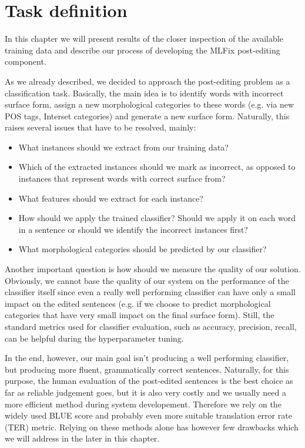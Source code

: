 \chapter{Task definition}
\label{chap:task_descr}

In this chapter we will present results of the closer inspection
of the available training data and describe our process of developing
the MLFix post-editing component.


As we already described, we decided to approach the post-editing problem as a classification
task. Basically, the main idea is to identify words with incorrect surface form,
assign a new morphological categories to these words (e.g. via new POS tags, Interset
categories) and generate a new surface form. Naturally, this raises several issues
that have to be resolved, mainly:
\begin{itemize}
    \item What instances should we extract from our training data?
    \item Which of the extracted instances should we mark as incorrect, as opposed
        to instances that represent words with correct surface from?
    \item What features should we extract for each instance?
    \item How should we apply the trained classifier? Should we apply it
        on each word in a sentence or should we identify the incorrect instances
        first?
    \item What morphological categories should be predicted by our classifier?
\end{itemize}

Another important question is how should we measure the quality of our solution.
Obviously, we cannot base the quality of our system on the performance of the
classifier itself since even a really well performing classifier can have only a small
impact on the edited sentences (e.g. if we choose to predict morphological categories
that have very small impact on the final surface form). Still, the standard metrics
used for classifier evaluation, such as accuracy, precision, recall, can be helpful
during the hyperparameter tuning.

In the end, however, our main goal isn't producing a well performing classifier, but producing
more fluent, grammatically correct sentences.
Naturally, for this purpose, the human evaluation of the post-edited sentences is the best choice as far
as reliable judgement goes, but it is also very costly and we usually need a more efficient
method during system developement. Therefore we rely on the widely used BLUE score and
probably even more suitable translation error rate (TER) metric. Relying on these methods alone
has however few drawbacks which we will address in the later in this chapter.

